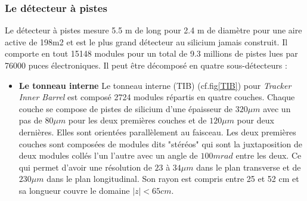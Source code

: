 \subsubsection{Le détecteur à pistes}
Le détecteur à pistes mesure 5.5 m de long pour 2.4 m de diamètre pour une aire active de 198m2 et est le plus grand détecteur au silicium jamais construit. Il comporte en tout 15148 modules pour un total de 9.3 millions de pistes lues par 76000 puces électroniques. Il peut être décomposé en quatre sous-détecteurs :

\begin{itemize}[label=$\bullet$]
\item \textbf{Le tonneau interne} Le tonneau interne (TIB) (cf.fig\ref{TIB}) pour  \textit{Tracker Inner Barrel} est composé 2724 modules répartis en quatre couches. Chaque couche se compose de pistes de silicium d'une épaisseur de $320 \mu m$ avec un pas de $80 \mu m$ pour les deux premières couches et de $120\mu m$ pour deux dernières. Elles sont orientées parallèlement au faisceau. Les deux premières couches sont composées de modules dits "stéréos" qui sont la juxtaposition de deux modules collés l'un l'autre avec un angle de $100mrad$ entre les deux. Ce qui permet d'avoir une résolution de $23$ à $34\mu m$ dans le plan transverse et de $230\mu m$ dans le plan longitudinal. Son rayon est compris entre 25 et 52 cm et sa longueur couvre le domaine $|z|<65cm$.


\end{itemize}
